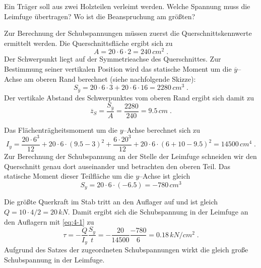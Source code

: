 \begin{example}
	Ein Träger soll aus zwei Holzteilen verleimt werden. Welche Spannung muss die Leimfuge übertragen?
	Wo ist die Beanspruchung am größten?
	\begin{center}
		
	\end{center}
	
	Zur Berechnung der Schubspannungen müssen zuerst die Querschnittskennwerte ermittelt werden.
	Die Querschnittsfläche ergibt sich zu
	\[
	A = 20\cdot 6\cdot 2 = 240\,\unit{cm^2} \; .
	\]
	Der Schwerpunkt liegt auf der Symmetrieachse des Querschnittes.
	Zur Bestimmung seiner vertikalen Position wird das statische Moment um die $\overline{y}$--Achse am oberen Rand berechnet (siehe nachfolgende Skizze):
	\[
	S_{\overline{y}} = 20\cdot 6\cdot 3 + 20\cdot 6\cdot 16 = 2280\,\unit{cm^3}\;.
	\]
	Der vertikale Abstand des Schwerpunktes vom oberen Rand ergibt sich damit zu
	\[
	\overline{z}_S = \dfrac{S_{\overline{y}}}{A}=\dfrac{2280}{240} = 9.5\,\unit{cm}\;.
	\]
	\begin{center}
		
	\end{center}
	Das Flächenträgheitsmoment um die $y$--Achse berechnet sich zu
	\[
	I_y = \dfrac{20\cdot 6^3}{12}+20\cdot 6 \cdot(9.5-3)^2 + \dfrac{6\cdot 20^3}{12}+20\cdot 6\cdot(6+10-9.5)^2=14500\,\unit{cm^4} \; .
	\]
	Zur Berechnung der Schubspannung an der Stelle der Leimfuge schneiden wir den Querschnitt genau dort auseinander und betrachten den oberen Teil.
	Das statische Moment dieser Teilfläche um die $y$--Achse ist gleich
	\[
	S_y = 20\cdot 6\cdot (-6.5) = -780\,\unit{cm^3}
	\]
	\begin{center}
		
	\end{center}
	Die größte Querkraft im Stab tritt an den Auflager auf und ist gleich $Q=10\cdot 4/2 = 20\,\unit{kN}$.
	Damit ergibt sich die Schubspannung in der Leimfuge an den Auflagern mit \eqref{eq:4-1} zu
	\[
	\tau = -\dfrac{Q}{I_y}\dfrac{S_y}{t} = -\dfrac{20}{14500}\dfrac{-780}{6}= 0.18\,\unit{kN/cm^2}\; .
	\]
	Aufgrund des Satzes der zugeordneten Schubspannungen wirkt die gleich große Schubspannung in der Leimfuge.
	\begin{center}
		
	\end{center}
\end{example}

